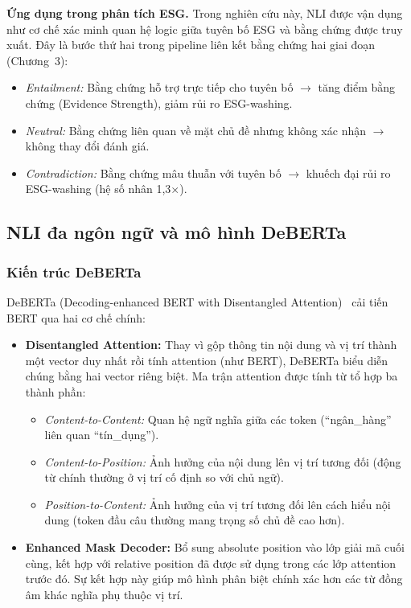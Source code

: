 \textbf{Ứng dụng trong phân tích ESG.} Trong nghiên cứu này, NLI được vận dụng như cơ chế xác minh quan hệ logic giữa tuyên bố ESG và bằng chứng được truy xuất. Đây là bước thứ hai trong pipeline liên kết bằng chứng hai giai đoạn (Chương~3):
\begin{itemize}
    \item \textit{Entailment:} Bằng chứng hỗ trợ trực tiếp cho tuyên bố $\rightarrow$ tăng điểm bằng chứng (Evidence Strength), giảm rủi ro ESG-washing.
    \item \textit{Neutral:} Bằng chứng liên quan về mặt chủ đề nhưng không xác nhận $\rightarrow$ không thay đổi đánh giá.
    \item \textit{Contradiction:} Bằng chứng mâu thuẫn với tuyên bố $\rightarrow$ khuếch đại rủi ro ESG-washing (hệ số nhân 1,3$\times$).
\end{itemize}


\subsection{NLI đa ngôn ngữ và mô hình DeBERTa}
\label{subsec:deberta}

\subsubsection{Kiến trúc DeBERTa}

DeBERTa (Decoding-enhanced BERT with Disentangled Attention)~\cite{he2021deberta} cải tiến BERT qua hai cơ chế chính:

\begin{itemize}
    \item \textbf{Disentangled Attention:} Thay vì gộp thông tin nội dung và vị trí thành một vector duy nhất rồi tính attention (như BERT), DeBERTa biểu diễn chúng bằng hai vector riêng biệt. Ma trận attention được tính từ tổ hợp ba thành phần:
    \begin{itemize}
        \item \textit{Content-to-Content:} Quan hệ ngữ nghĩa giữa các token (``ngân\_hàng'' liên quan ``tín\_dụng'').
        \item \textit{Content-to-Position:} Ảnh hưởng của nội dung lên vị trí tương đối (động từ chính thường ở vị trí cố định so với chủ ngữ).
        \item \textit{Position-to-Content:} Ảnh hưởng của vị trí tương đối lên cách hiểu nội dung (token đầu câu thường mang trọng số chủ đề cao hơn).
    \end{itemize}

    \item \textbf{Enhanced Mask Decoder:} Bổ sung absolute position vào lớp giải mã cuối cùng, kết hợp với relative position đã được sử dụng trong các lớp attention trước đó. Sự kết hợp này giúp mô hình phân biệt chính xác hơn các từ đồng âm khác nghĩa phụ thuộc vị trí.
\end{itemize}



